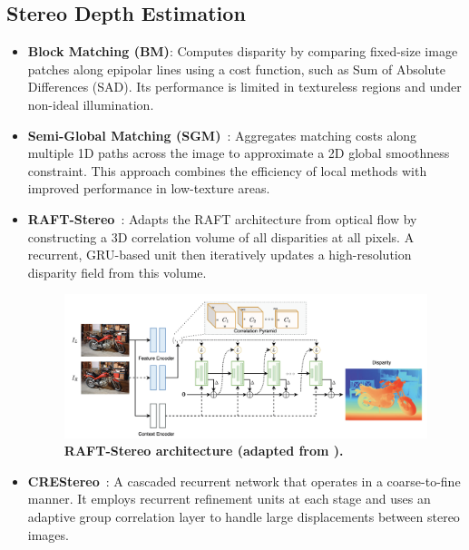 \subsection{Stereo Depth Estimation}
\label{sec:stereo_depth_estimation}
\begin{itemize}
	\item \textbf{Block Matching (BM)}: Computes disparity by comparing fixed-size image patches along epipolar lines using a cost function, such as Sum of Absolute Differences (SAD). Its performance is limited in textureless regions and under non-ideal illumination.

	\item \textbf{Semi-Global Matching (SGM)}~\cite{hirschmuller_stereo_2008}: Aggregates matching costs along multiple 1D paths across the image to approximate a 2D global smoothness constraint. This approach combines the efficiency of local methods with improved performance in low-texture areas.

	\item \textbf{RAFT-Stereo}~\cite{lipson_raft-stereo_2021}: Adapts the RAFT architecture from optical flow by constructing a 3D correlation volume of all disparities at all pixels. A recurrent, GRU-based unit then iteratively updates a high-resolution disparity field from this volume.
	      \begin{figure}[htbp]
		      \centering
		      \includegraphics[width=\linewidth]{figures/raft_stereo.png}
		      \caption{\bfseries RAFT-Stereo architecture (adapted from \cite{lipson_raft-stereo_2021}).}
		      \label{fig:raft_stereo}
	      \end{figure}

	\item \textbf{CREStereo}~\cite{li_practical_2022}: A cascaded recurrent network that operates in a coarse-to-fine manner. It employs recurrent refinement units at each stage and uses an adaptive group correlation layer to handle large displacements between stereo images.
\end{itemize}

